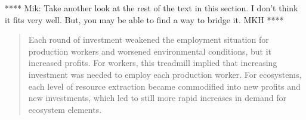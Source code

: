 %

**** Mik: Take another look at the rest of the text in this section. 
I don't think it fits very well. 
But, you may be able to find a way to bridge it. MKH ****

\begin{quote}
	Each round of investment weakened the employment situation 
	for production workers and worsened environmental conditions, 
	but it increased profits. 
	For workers, this treadmill implied that increasing investment 
	was needed to employ each production worker. 
	For ecosystems, each level of resource extraction became 
	commodified into new profits and new investments, 
	which led to still more rapid increases in demand 
	for ecosystem elements.~\cite[p.296]{Gould2004}
\end{quote}

